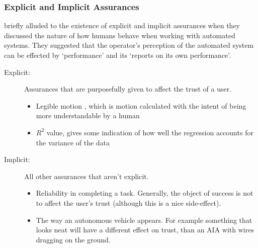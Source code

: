 \subsubsection{Explicit and Implicit Assurances}
\citet{Sheridan1984-kx} briefly alluded to the existence of explicit and implicit assurances when they discussed the nature of how humans behave when working with automated systems. They suggested that the operator's perception of the automated system can be effected by `performance' and its `reports on its own performance'. 


\begin{description}
    \item [Explicit:] Assurances that are purposefully given to affect the trust of a user.
    \begin{itemize}
        \item Legible motion \cite{Dragan2013-wd}, which is motion calculated with the intent of being more understandable by a human
        \item $R^2$ value, gives some indication of how well the regression accounts for the variance of the data
    \end{itemize}
    \item [Implicit:] All other assurances that aren't explicit.
    \begin{itemize}
        \item Reliability in completing a task. Generally, the object of success is not to affect the user's trust (although this is a nice side-effect).
        \item The way an autonomous vehicle appears. For example something that looks neat will have a different effect on trust, than an AIA with wires dragging on the ground. 
    \end{itemize}
\end{description}


